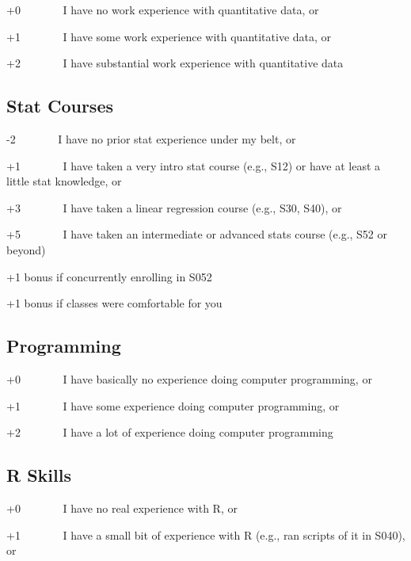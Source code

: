 \documentclass[
  letterpaper,
  DIV=11,
  numbers=noendperiod]{scrreprt}
\begin{document}
+0~~~~~~~ I have no work experience with quantitative data, or

+1~~~~~~~ I have some work experience with quantitative data, or

+2~~~~~~~ I have substantial work experience with quantitative data

\hypertarget{stat-courses}{%
\subsection*{\texorpdfstring{\textbf{Stat
Courses}}{Stat Courses}}\label{stat-courses}}

-2~~~~~~~ I have no prior stat experience under my belt, or

+1~~~~~~~ I have taken a very intro stat course (e.g., S12) or have at
least a little stat knowledge, or

+3~~~~~~~ I have taken a linear regression course (e.g., S30, S40), or

+5~~~~~~~ I have taken an intermediate or advanced stats course (e.g.,
S52 or beyond)

+1 bonus if concurrently enrolling in S052

+1 bonus if classes were comfortable for you

\hypertarget{programming}{%
\subsection*{\texorpdfstring{\textbf{Programming}}{Programming}}\label{programming}}

+0~~~~~~~ I have basically no experience doing computer programming, or

+1~~~~~~~ I have some experience doing computer programming, or

+2~~~~~~~ I have a lot of experience doing computer programming

\hypertarget{r-skills}{%
\subsection*{\texorpdfstring{\textbf{R
Skills}}{R Skills}}\label{r-skills}}

+0~~~~~~~ I have no real experience with R, or

+1~~~~~~~ I have a small bit of experience with R (e.g., ran scripts of
it in S040), or
\end{document}

